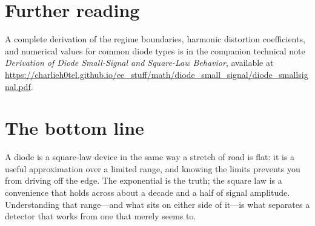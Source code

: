 \documentclass[12pt]{article}
\begin{document}
\section*{Further reading}

A complete derivation of the regime boundaries, harmonic distortion coefficients, and numerical values for common diode types is in the companion technical note \textit{Derivation of Diode Small-Signal and Square-Law Behavior}, available at \url{https://charlieh0tel.github.io/ee_stuff/math/diode_small_signal/diode_smallsignal.pdf}.

\section*{The bottom line}

A diode is a square-law device in the same way a stretch of road is flat: it is a useful approximation over a limited range, and knowing the limits prevents you from driving off the edge.
The exponential is the truth; the square law is a convenience that holds across about a decade and a half of signal amplitude.
Understanding that range---and what sits on either side of it---is what separates a detector that works from one that merely seems to.
\end{document}
